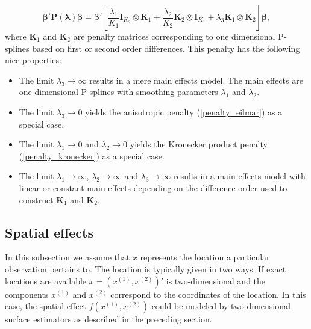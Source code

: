 \documentclass[11pt,a4paper,twoside]{bayesxarticle}
\def \Kvec {\vec{K}}
\def \Pvec {\vec{P}}
\def \lambdavec {\boldsymbol{\lambda}}
\def \betavec {\boldsymbol{\beta}}
\def \Kvec {\mathbf{K}}
\def \Ivec {\mathbf{I}}
\def \Pvec {\mathbf{P}}
\begin{document}
\begin{enumerate}
\begin{equation}
\label{penalty_comb}
\betavec'\Pvec(\lambdavec)\betavec = \betavec' \left[\frac{\lambda_1}{K_1}
\Ivec_{K_2}\otimes\Kvec_1 + \frac{\lambda_2}{K_2} \Kvec_2\otimes \Ivec_{K_1}+\lambda_3 \Kvec_1 \otimes \Kvec_2   \right] \betavec,
\end{equation}
where $\Kvec_1$ and $\Kvec_2$ are penalty matrices corresponding to one dimensional P-splines based on first or second order differences.
This penalty has the following nice properties:
\begin{itemize}
\item The limit $\lambda_3 \rightarrow \infty$ results in a mere main effects model. The main effects  are one dimensional P-splines with smoothing
parameters $\lambda_1$ and $\lambda_2$.
\item The limit $\lambda_3 \rightarrow 0$ yields the anisotropic penalty (\ref{penalty_eilmar}) as a special case.
\item The limit $\lambda_1 \rightarrow 0$ and $\lambda_2 \rightarrow 0$  yields the Kronecker product penalty
(\ref{penalty_kronecker}) as a special case.
\item The limit $\lambda_1 \rightarrow \infty$, $\lambda_2 \rightarrow \infty$ and $\lambda_3 \rightarrow \infty$ results in a main effects model with
linear or constant main effects depending on the difference order used to construct $\Kvec_1$ and $\Kvec_2$.
\end{itemize}
\end{enumerate}


\subsection{Spatial effects}

In this subsection we assume that $x$ represents the location a
particular observation pertains to. The location is typically given
in two ways. If exact locations are available $x=(x^{(1)},x^{(2)})'$
is two-dimensional and the components  $x^{(1)}$ and $x^{(2)}$
correspond to the coordinates of the location. In this case, the
spatial effect $f(x^{(1)},x^{(2)})$ could be modeled by
two-dimensional surface estimators as described in the preceding
section.
\end{document}

